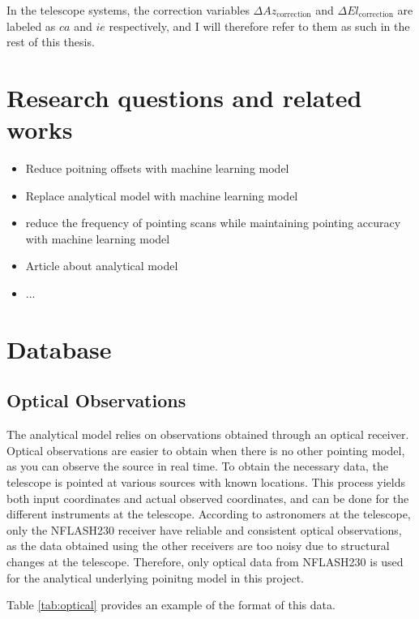 In the telescope systems, the correction variables $\Delta Az_\text{correction}$ and $\Delta El_\text{correction}$ are labeled as $ca$ and $ie$ respectively,
and I will therefore refer to them as such in the rest of this thesis.

\section{Research questions and related works}
\begin{itemize}
    \item Reduce poitning offsets with machine learning model
    \item Replace analytical model with machine learning model
    \item reduce the frequency of pointing scans while maintaining pointing accuracy with machine learning model
\end{itemize}

\begin{itemize}
    \item Article about analytical model
    \item ...
\end{itemize}

\section{Database}


\subsection{Optical Observations}
The analytical model relies on observations obtained through an optical receiver.
Optical observations are easier to obtain when there is no other pointing model, as you can observe the source in real time.
To obtain the necessary data, the telescope is pointed at various sources with known locations.
This process yields both input coordinates and actual observed coordinates, and can be done for the different instruments at the telescope.
According to astronomers at the telescope, only the NFLASH230 receiver have reliable and consistent optical observations, as the data obtained using the other receivers
are too noisy due to structural changes at the telescope. Therefore, only optical data from NFLASH230 is used for the analytical underlying poinitng model in this project.

Table \ref{tab:optical} provides an example of the format of this data.
    

